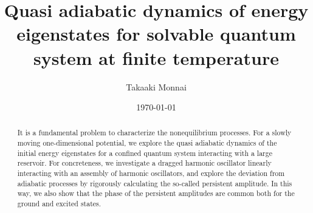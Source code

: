 \documentclass[aps,pre,twocolumn,eqsecnum,showpacs,superscriptaddress]{revtex4}
\begin{document}


\title{Quasi adiabatic dynamics of energy eigenstates for solvable quantum system at finite temperature}




\author{Takaaki Monnai}




\date{\today}


\begin{abstract}
It is a fundamental problem to characterize the nonequilibrium processes. For a slowly moving one-dimensional potential, we explore the quasi adiabatic dynamics of the initial energy eigenstates for a confined quantum system interacting with a large reservoir. For concreteness, we investigate a dragged harmonic oscillator linearly interacting with an assembly of harmonic oscillators, and explore the deviation from adiabatic processes by rigorously calculating the so-called persistent amplitude. In this way, we also show that the phase of the persistent amplitudes are common both for the ground and excited states. 
\end{abstract}       
\end{document}
